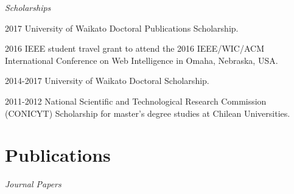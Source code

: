 \documentclass[letterpaper]{article}
\begin{document}
\begin{flushleft}
\emph{Scholarships}
\end{flushleft}

\begin{CV}

\item[2017] University of Waikato Doctoral Publications Scholarship.

\item[2016] IEEE student travel grant to attend the 2016
IEEE/WIC/ACM International Conference on Web Intelligence in Omaha, Nebraska, USA.

\item[2014-2017]  University of Waikato Doctoral Scholarship.

\item[2011-2012]  National Scientific and Technological Research Commission (CONICYT) Scholarship for master's degree studies at Chilean Universities.



\end{CV}






\section{Publications}

\begin{flushleft}
\emph{Journal Papers}
\end{flushleft}
\end{document}
